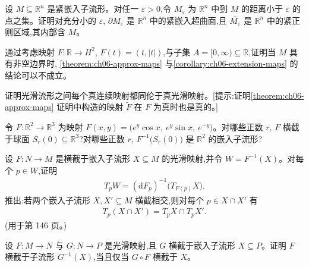 \documentclass[../../main.tex]{subfiles}
\begin{document}
\begin{exercise}\label{exercise:ch06-06}
设 $M\subseteq\mathbb{R}^n$ 是紧嵌入子流形。对任一 $\varepsilon>0$,令 $M_\varepsilon$ 为 $\mathbb{R}^n$ 中到 $M$ 的距离小于 $\varepsilon$ 的点之集。证明对充分小的 $\varepsilon$, $\partial M_\varepsilon$ 是 $\mathbb{R}^n$ 中的紧嵌入超曲面,且 $\overline{M_\varepsilon}$ 是 $\mathbb{R}^n$ 中的紧正则区域,其内部含 $M$。
\end{exercise}

\begin{exercise}\label{exercise:ch06-07}
通过考虑映射 $F:\mathbb{R}\to H^2$, $F(t)=(t,|t|)$,与子集 $A=[0,\infty)\subseteq\mathbb{R}$,证明当 $M$ 具有非空边界时, \cref{theorem:ch06-approx-maps} 与\cref{corollary:ch06-extension-maps} 的结论可以不成立。
\end{exercise}

\begin{exercise}\label{exercise:ch06-08}
证明光滑流形之间每个真连续映射都同伦于真光滑映射。[提示:证明\cref{theorem:ch06-approx-maps} 证明中构造的映射 $\widetilde{F}$ 在 $F$ 为真时也是真的。]
\end{exercise}

\begin{exercise}\label{exercise:ch06-09}
令 $F:\mathbb{R}^2\to\mathbb{R}^3$ 为映射 $F(x,y)=\bigl(e^y\cos x,\ e^y\sin x,\ e^{-y}\bigr)$。对哪些正数 $r$, $F$ 横截于球面 $S_r(0)\subseteq\mathbb{R}^3$?对哪些正数 $r$, $F^{-1}\bigl(S_r(0)\bigr)$ 是 $\mathbb{R}^2$ 的嵌入子流形?
\end{exercise}

\begin{exercise}\label{exercise:ch06-10}
设 $F:N\to M$ 是横截于嵌入子流形 $X\subseteq M$ 的光滑映射,并令 $W=F^{-1}(X)$。对每个 $p\in W$,证明
\begin{align*}
T_pW=(\mathrm{d}F_p)^{-1}\bigl(T_{F(p)}X\bigr).
\end{align*}
推出:若两个嵌入子流形 $X,X'\subseteq M$ 横截相交,则对每个 $p\in X\cap X'$ 有
\begin{align*}
T_p(X\cap X')=T_pX\cap T_pX'.
\end{align*}
(用于第 146 页。)
\end{exercise}

\begin{exercise}\label{exercise:ch06-11}
设 $F:M\to N$ 与 $G:N\to P$ 是光滑映射,且 $G$ 横截于嵌入子流形 $X\subseteq P$。证明 $F$ 横截于子流形 $G^{-1}(X)$,当且仅当 $G\circ F$ 横截于 $X$。
\end{exercise}
\end{document}
